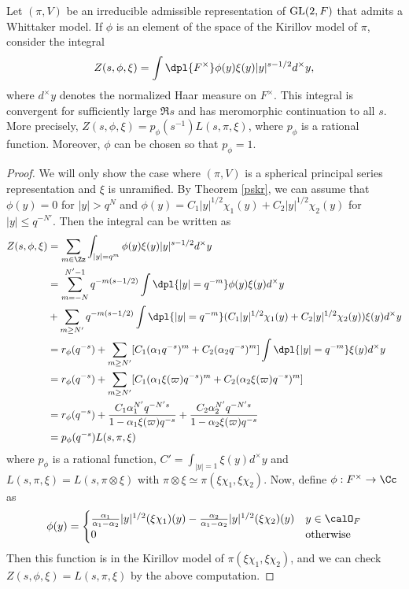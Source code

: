 \begin{proposition}
Let $(\pi, V)$ be an irreducible admissible representation of $\mathrm{GL}(2, F)$ that admits a Whittaker model. 
If $\phi$ is an element of the space of the Kirillov model of $\pi$, consider the integral 
$$
Z(s, \phi, \xi) = \int\dpl{F^{\times}} \phi(y)\xi(y)|y|^{s-1/2} d^{\times}y, 
$$
where $d^{\times}y$ denotes the normalized Haar measure on $F^{\times}$. 
This integral is convergent for sufficiently large $\Re s$ and has meromorphic continuation to all $s$. 
More precisely, $Z(s, \phi, \xi) = p_{\phi}(s^{-1})L(s, \pi, \xi)$, where $p_{\phi}$ is a rational function. 
Moreover, $\phi$ can be chosen so that $p_{\phi} = 1$. 
\end{proposition}
\begin{proof}
We will only show the case where $(\pi, V)$ is a spherical principal series representation and $\xi$ is unramified. 
By Theorem \ref{pskr}, we can assume that $\phi(y) = 0$ for $|y| > q^N$ and  $\phi(y) = C_{1}|y|^{1/2}\chi_1(y) + C_{2}|y|^{1/2}\chi_2(y)$ for $|y|\leq q^{-N'}$. 
Then the integral can be written as
\begin{align*}
Z(s, \phi, \xi) &= \sum_{m\in \Zz} \int_{|y| = q^{m}} \phi(y)\xi(y) |y|^{s-1/2} d^{\times}y \\
&= \sum_{m=-N}^{N' - 1} q^{-m(s-1/2)} \int\dpl{|y| = q^{-m}} \phi(y)\xi(y)d^{\times}y \\
&+ \sum_{m\geq N'} q^{-m(s-1/2)}\int\dpl{|y| = q^{-m}} (C_{1}|y|^{1/2}\chi_1(y) + C_{2}|y|^{1/2} \chi_2(y)) \xi(y) d^{\times}y \\
&=r_{\phi}(q^{-s}) + \sum_{m\geq N'} [C_{1} (\alpha_1 q^{-s})^{m}  + C_{2}(\alpha_{2} q^{-s})^{m}]\int\dpl{|y| = q^{-m}}\xi(y)d^{\times}y \\
&= r_{\phi}(q^{-s}) + \sum_{m\geq N'} [C_{1} (\alpha_1 \xi(\varpi) q^{-s})^{m}  + C_{2}(\alpha_{2} \xi(\varpi)q^{-s})^{m}] \\
&= r_{\phi}(q^{-s}) + \frac{C_1 \alpha_{1}^{N'} q^{-N's}}{1-\alpha_{1}\xi(\varpi)q^{-s}} + \frac{C_2 \alpha_{2}^{N'} q^{-N's}}{1-\alpha_{2}\xi(\varpi)q^{-s}} \\
&=p_{\phi}(q^{-s}) L(s, \pi, \xi)
\end{align*}
where $p_{\phi}$ is a rational function, $C' = \int_{|y| = 1} \xi(y)d^{\times} y$ and $L(s, \pi, \xi) = L(s, \pi\otimes \xi)$ with $\pi\otimes \xi \simeq \pi(\xi \chi_1, \xi \chi_2)$. 
Now, define $\phi :F^{\times} \to \Cc$ as
$$
\phi(y) = \begin{cases} \frac{\alpha_{1}}{\alpha_{1} - \alpha_{2}} |y|^{1/2} (\xi\chi_{1})(y) - \frac{\alpha_{2}}{\alpha_{1} - \alpha_{2}} |y|^{1/2} (\xi\chi_{2})(y) & y\in \calO_F \\ 0 & \text{otherwise}\end{cases}
$$
Then this function is in the Kirillov model of $\pi(\xi \chi_1, \xi\chi_2)$, and we can check $Z(s, \phi, \xi) = L(s, \pi, \xi)$ by the above computation. 
\end{proof}

